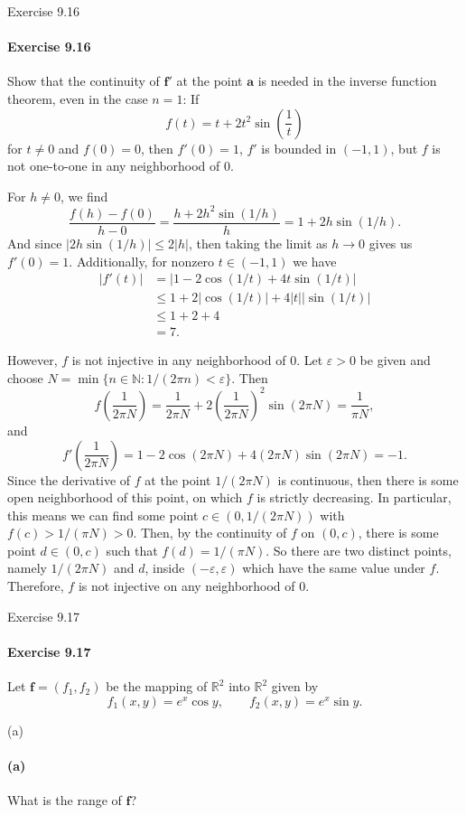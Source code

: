 \documentclass[12pt]{article}
\newenvironment{fullbox}{\begin{lrbox}{\savefullbox}\begin{minipage}{\dimexpr\textwidth-2\fboxsep\relax}}{\end{minipage}\end{lrbox}\begin{center}\framebox[\textwidth]{\usebox{\savefullbox}}\end{center}}
\newenvironment{pbox}[1][]{\begin{fullbox}\ifx#1\empty\else\paragraph{#1}\fi}{\end{fullbox}}
\theoremstyle{definition}
\newcommand{\N}{\mathbb{N}}
\newcommand{\R}{\mathbb{R}}
\newcommand{\eps}{\varepsilon}
\newcommand{\pfrac}[2]{\left(\frac{#1}{#2}\right)}
\newcommand{\f}{\mathbf{f}}
\renewcommand{\aa}{\mathbf{a}}
\begin{document}
\thispagestyle{title}


\begin{pbox}[Exercise 9.16]
    Show that the continuity of $\f'$ at the point $\aa$ is needed in the inverse function theorem, even in the case $n = 1$: If
    \[
        f(t) = t + 2t^2\sin\left(\frac{1}{t}\right)
    \]
    for $t \ne 0$ and $f(0) = 0$, then $f'(0) = 1$, $f'$ is bounded in $(-1, 1)$, but $f$ is not one-to-one in any neighborhood of $0$.
\end{pbox}

For $h \ne 0$, we find
\[
    \frac{f(h) - f(0)}{h - 0}
        = \frac{h + 2h^2\sin(1/h)}{h}
        = 1 + 2h\sin(1/h).
\]
And since $|2h\sin(1/h)| \leq 2|h|$, then taking the limit as $h \to 0$ gives us $f'(0) = 1$. Additionally, for nonzero $t \in (-1, 1)$ we have
\begin{align*}
    |f'(t)| &= |1 - 2\cos(1/t)  + 4t\sin(1/t)| \\
        &\leq 1 + 2 |\cos(1/t)| + 4|t||\sin(1/t)| \\
        &\leq 1 + 2 + 4 \\
        &= 7.
\end{align*}

However, $f$ is not injective in any neighborhood of $0$. Let $\eps > 0$ be given and choose $N = \min\{n \in \N : 1/(2\pi n) < \eps\}$. Then
\[
    f\left(\frac{1}{2\pi N}\right) = \frac{1}{2\pi N} + 2\pfrac{1}{2\pi N}^2 \sin(2\pi N) = \frac{1}{\pi N},
\]
and
\[
    f'\left(\frac{1}{2\pi N}\right) = 1 - 2\cos(2\pi N)  + 4(2\pi N)\sin(2\pi N) = -1.
\]
Since the derivative of $f$ at the point $1/(2\pi N)$ is continuous, then there is some open neighborhood of this point, on which $f$ is strictly decreasing. In particular, this means we can find some point $c \in (0, 1/(2\pi N))$ with $f(c) > 1/(\pi N) > 0$. Then, by the continuity of $f$ on $(0, c)$, there is some point $d \in (0, c)$ such that $f(d) = 1/(\pi N)$. So there are two distinct points, namely $1/(2\pi N)$ and $d$, inside $(-\eps, \eps)$ which have the same value under $f$. Therefore, $f$ is not injective on any neighborhood of $0$.



\newpage
\begin{pbox}[Exercise 9.17]
    Let $\f = (f_1, f_2)$ be the mapping of $\R^2$ into $\R^2$ given by
    \[
        f_1(x, y) = e^x \cos y, \qquad f_2(x, y) = e^x \sin y.
    \]
\end{pbox}

\begin{pbox}[(a)]
    What is the range of $\f$?
\end{pbox}
\end{document}
